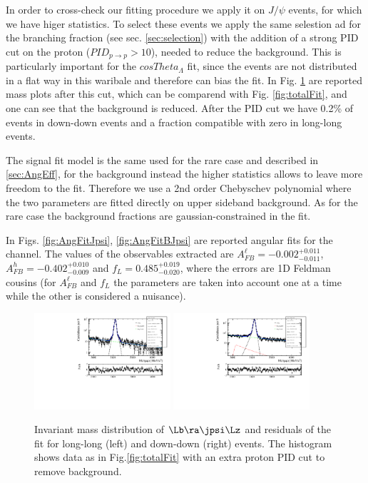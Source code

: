 In order to cross-check our fitting procedure we apply it on $J/\psi$ events, for which we have higer statistics.
To select these events we apply the same selestion ad for the branching fraction (see sec. \ref{sec:selection}) with
the addition of a strong PID cut on the proton ($PID_{p\rightarrow p} > 10$), needed to reduce the
\KS\jpsi background. This is particularly important for the $cosTheta_{\Lambda}$ fit, since 
the \KS events are not distributed in a flat way in this waribale and therefore can bias the fit.
In Fig. \ref{fig:Jpsimass_angular} are reported mass plots after this cut, which can be comparend with
Fig. \ref{fig:totalFit}, and one can see that the \KS background is reduced. After the PID cut we have 0.2\% of \KS
events in down-down events and a fraction compatible with zero in long-long events.

The signal fit model is the same used for the rare case and described in \ref{sec:AngEff},
for the background instead the higher statistics allows to leave more freedom to the fit.
Therefore we use a 2nd order Chebyschev polynomial where the two parameters are fitted directly on upper sideband background.
As for the rare case the background fractions are gaussian-constrained in the fit.

In Figs. \ref{fig:AngFitJpsi}, \ref{fig:AngFitBJpsi} are reported angular fits for the \jpsi channel. The values of the observables extracted are $A_{FB}^\ell = -0.002^{+0.011}_{-0.011}$, $A_{FB}^h = -0.402^{+0.010}_{-0.009}$ and $f_{L} = 0.485^{+0.019}_{-0.020}$, where the errors are 1D Feldman cousins (for $A_{FB}^\ell$ and $f_L$ the parameters are taken into account one at a time while the other is considered a nuisance).

\begin{figure}
\centering
\includegraphics[width=0.45\textwidth]{Lmumu/figs/Jpsi_default_LL_log_fitAndRes.pdf}
\includegraphics[width=0.45\textwidth]{Lmumu/figs/Jpsi_default_DD_log_fitAndRes.pdf}
\caption{Invariant mass distribution of $\Lb\ra\jpsi\Lz$ and residuals of the fit for long-long (left) and down-down (right) events.
The histogram shows data as in Fig.\ref{fig:totalFit} with an extra proton PID cut to remove \KS background.}
\label{fig:Jpsimass_angular}
\end{figure}
%

